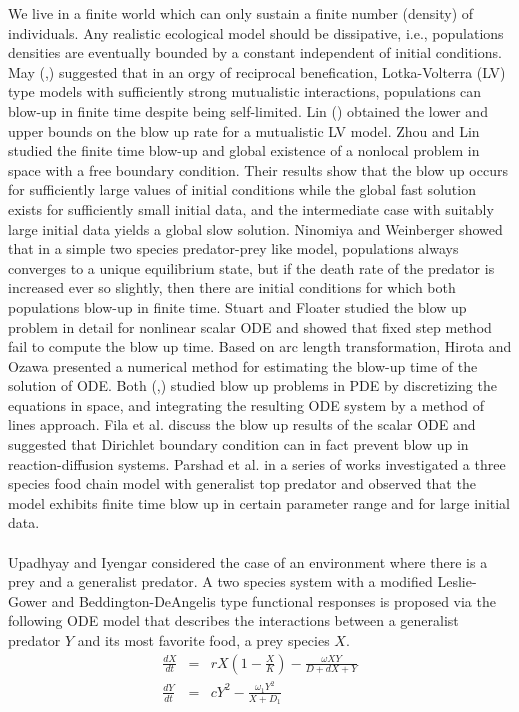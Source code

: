 \documentclass[10pt]{amsart}
\theoremstyle{definition}
\begin{document}
We live in a finite world which can only sustain a finite number (density) of individuals. Any realistic ecological model should be dissipative, i.e., populations densities are eventually bounded by a constant independent of initial conditions. May (\cite{RM76},\cite{RM82}) suggested that in an orgy of reciprocal benefication, Lotka-Volterra (LV) type models with sufficiently strong mutualistic interactions, populations can blow-up in finite time despite being self-limited. Lin (\cite{Lin02}) obtained the lower and upper bounds on the blow up rate for a  mutualistic LV model. Zhou and Lin \cite{ZL12} studied the finite time blow-up and global existence of a nonlocal problem in space with a free boundary condition. Their results show that the blow up occurs for sufficiently large values of initial conditions while the global fast solution exists for sufficiently small initial data, and the intermediate case with suitably large initial data yields a global slow solution. Ninomiya and Weinberger \cite{NH03} showed that in a simple two species predator-prey like model, populations always converges to a unique equilibrium state, but if the death rate of the predator is increased ever so slightly, then there are initial conditions for which both populations blow-up in finite time. Stuart and Floater \cite{AM90} studied the blow up problem in detail for nonlinear scalar ODE and showed that fixed step method fail to compute the blow up time. Based on arc length transformation, Hirota and Ozawa \cite{CK06} presented a numerical method for estimating the blow-up time of the solution of ODE. Both (\cite{AM90},\cite{CK06}) studied blow up problems in PDE by discretizing  the equations in space, and integrating the resulting ODE system  by a method of lines approach. Fila et al. \cite{MH06} discuss the blow up results of the scalar ODE and suggested that Dirichlet boundary condition can in fact prevent blow up in reaction-diffusion systems.
Parshad et al. in a series of works \cite{RD13, PKK15} investigated a three species food chain model with generalist top predator and observed that the model exhibits finite time blow up in certain parameter range and for large initial data.  \\  
\\
    Upadhyay and Iyengar \cite{RK13} considered the case of an environment where there is a prey and a generalist predator. A two species system with a modified Leslie-Gower  and Beddington-DeAngelis type functional responses is proposed via the following ODE model that describes the interactions between a generalist predator $Y$ and its most favorite food, 
	a prey species $X$.
\begin{eqnarray}
\label{eq:1}
\frac{dX}{dt}&=&rX(1-\frac{X}{K})-\frac{\omega XY}{D+dX+Y}\\
 
\frac{dY}{dt}&=&cY^2-\frac{\omega_{1}Y^2}{X+D_{1}} \nonumber
\end{eqnarray}
\end{document}
